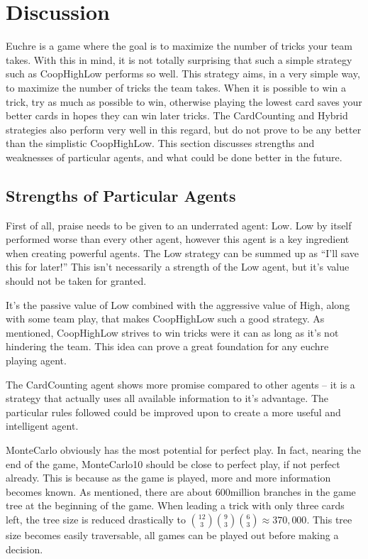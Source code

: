 
\section{Discussion}

Euchre is a game where the goal is to maximize the number of tricks your team takes. With this in mind, it is not
totally surprising that such a simple strategy such as CoopHighLow performs so well. This strategy aims, in a very simple way,
to maximize the number of tricks the team takes. When it is possible to win a trick, try as much as possible to win, otherwise
playing the lowest card saves your better cards in hopes they can win later tricks. The CardCounting and Hybrid strategies also
perform very well in this regard, but do not prove to be any better than the simplistic CoopHighLow. This section discusses
strengths and weaknesses of particular agents, and what could be done better in the future.


\subsection{Strengths of Particular Agents}

First of all, praise needs to be given to an underrated agent: Low. Low by itself performed worse than every other agent, however
this agent is a key ingredient when creating powerful agents. The Low strategy can be summed up as ``I'll save this for later!''
This isn't necessarily a strength of the Low agent, but it's value should not be taken for granted.

It's the passive value of Low combined with the aggressive value of High, along with some team play, that makes CoopHighLow such
a good strategy. As mentioned, CoopHighLow strives to win tricks were it can as long as it's not hindering the team. This idea
can prove a great foundation for any euchre playing agent.

The CardCounting agent shows more promise compared to other agents -- it is a strategy that actually uses all available information
to it's advantage. The particular rules followed could be improved upon to create a more useful and intelligent agent.

MonteCarlo obviously has the most potential for perfect play. In fact, nearing the end of the game, MonteCarlo10 should be close to perfect play,
if not perfect already. This is because as the game is played, more and more information becomes known. As mentioned, there are about 600million
branches in the game tree at the beginning of the game. When leading a trick with only three cards left, the tree size is reduced drastically to
${12 \choose 3}{9 \choose 3}{6 \choose 3} \approx 370,000$. This tree size becomes easily traversable, all games can be played out before
making a decision.


